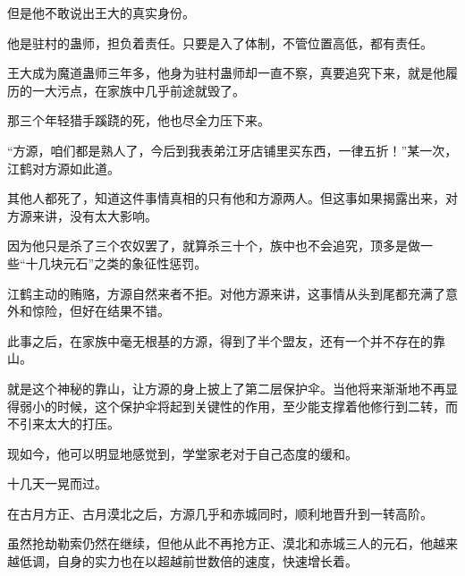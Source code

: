 \begin{this_body}
但是他不敢说出王大的真实身份。

他是驻村的蛊师，担负着责任。只要是入了体制，不管位置高低，都有责任。

王大成为魔道蛊师三年多，他身为驻村蛊师却一直不察，真要追究下来，就是他履历的一大污点，在家族中几乎前途就毁了。

那三个年轻猎手蹊跷的死，他也尽全力压下来。

“方源，咱们都是熟人了，今后到我表弟江牙店铺里买东西，一律五折！”某一次，江鹤对方源如此道。

其他人都死了，知道这件事情真相的只有他和方源两人。但这事如果揭露出来，对方源来讲，没有太大影响。

因为他只是杀了三个农奴罢了，就算杀三十个，族中也不会追究，顶多是做一些“十几块元石”之类的象征性惩罚。

江鹤主动的贿赂，方源自然来者不拒。对他方源来讲，这事情从头到尾都充满了意外和惊险，但好在结果不错。

此事之后，在家族中毫无根基的方源，得到了半个盟友，还有一个并不存在的靠山。

就是这个神秘的靠山，让方源的身上披上了第二层保护伞。当他将来渐渐地不再显得弱小的时候，这个保护伞将起到关键性的作用，至少能支撑着他修行到二转，而不引来太大的打压。

现如今，他可以明显地感觉到，学堂家老对于自己态度的缓和。

十几天一晃而过。

在古月方正、古月漠北之后，方源几乎和赤城同时，顺利地晋升到一转高阶。

虽然抢劫勒索仍然在继续，但他从此不再抢方正、漠北和赤城三人的元石，他越来越低调，自身的实力也在以超越前世数倍的速度，快速增长着。

\end{this_body}

